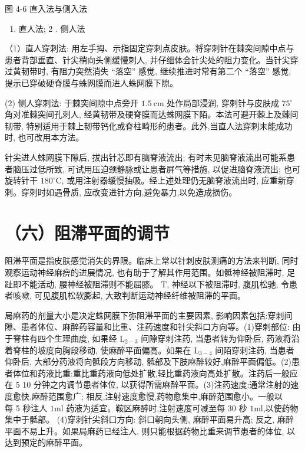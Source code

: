 \documentclass[10pt]{article}
\begin{document}
图 4-6 直入法与侧入法

\begin{enumerate}
  \item 直人法; 2 . 侧人法
\end{enumerate}

（1）直人穿刺法: 用左手拇、示指固定穿刺点皮肤。将穿刺针在棘突间隙中点与患者背部垂直、针尖稍向头侧缓慢刺人, 并仔细体会针尖处的阻力变化。当针尖穿过黄韧带时, 有阻力突然消失 “落空” 感觉, 继续推进时常有第二个 “落空” 感觉, 提示已穿破硬脊膜与蛛网膜而进人蛛网膜下隙。

(2) 侧人穿刺法: 于棘突间隙中点旁开 $1.5 \mathrm{~cm}$ 处作局部浸润, 穿刺针与皮肤成 $75^{\circ}$ 角对准棘突间孔刺人, 经黄韧带及硬脊膜而达蛛网膜下陌。本法可避开棘上及棘间韧带, 特别适用于棘上韧带钙化或脊柱畸形的患者。此外,当直人法穿刺未能成功时, 也可改用本方法。

针尖进人蛛网膜下隙后, 拔出针芯即有脑脊液流出; 有时未见脑脊液流出可能系患者脑压过低所致, 可试用压迫颈静脉或让患者屏气等措施, 以促进脑脊液流出; 也可旋转针干 $180^{\circ} \mathrm{C}$, 或用注射器缓慢抽吸。经上述处理仍无脑脊液流出时, 应重新穿刺。穿刺时如遇骨质, 应改变进针方向,避免暴力,以免造成损伤。

\section*{（六）阻滞平面的调节}
阻滞平面是指皮肤感觉消失的界限。临床上常以针刺皮肤测痛的方法来判断, 同时观察运动神经麻痹的进展情况, 也有助于了解其作用范围。如骶神经被阻滞时, 足趾即不能活动, 腰神经被阻滞则不能屈膝。 $\mathrm{T}$, 神经以下被阻滞时, 腹肌松驰, 令患者咳嗽, 可见腹肌松软膨起, 大致判断运动神经纤维被阻滞的平面。

局麻药的剂量大小是决定蛛网膜下弥阻滞平面的主要因素, 影响因素包括:穿刺间隙、患者体位、麻醉药容量和比重、注药速度和针尖斜口方向等。(1)穿刺部位: 由于脊柱有四个生理曲度, 如果经 $\mathrm{L}_{2-3}$ 间隙穿刺注药, 当患者转为仰卧后, 药液将沿着脊柱的坡度向胸段移动, 使麻醉平面偏高。如果在 $\mathrm{L}_{3-4}$ 间陌穿刺注药, 当患者仰卧后, 大部分药液将向骶段方向移动, 骶部及下肢麻醉较好,麻醉平面偏低。(2)患者体位和药液比重:重比重药液向低处扩散,轻比重药液向高处扩散。注药后一般应在 5 10 分钟之内调节患者体位, 以获得所需麻醉平面。(3)注药速度:通常注射的速度愈快,麻醉范围愈广; 相反,注射速度愈慢,药物愈集中,麻醉范围愈小。一般以\\
每 5 秒注人 $1 \mathrm{ml}$ 药液为适宜。鞍区麻醉时,注射速度可减至每 30 秒 $1 \mathrm{ml}$,以使药物集中于骶部。 (4)穿刺针尖斜口方向: 斜口朝向头侧, 麻醉平面易升高; 反之, 麻醉平面不易上升。如果局麻药已经注人, 则只能根据药物比重来调节患者的体位, 以达到预定的麻醉平面。
\end{document}
